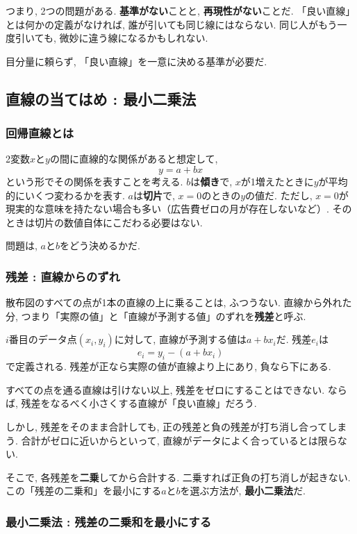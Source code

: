 つまり, 2つの問題がある.
\textbf{基準がない}ことと, \textbf{再現性がない}ことだ.
「良い直線」とは何かの定義がなければ, 誰が引いても同じ線にはならない.
同じ人がもう一度引いても, 微妙に違う線になるかもしれない.

目分量に頼らず, 「良い直線」を一意に決める基準が必要だ.


\subsection{直線の当てはめ : 最小二乗法}

\subsubsection*{回帰直線とは}

2変数$x$と$y$の間に直線的な関係があると想定して,
\[
  y = a + bx
\]
という形でその関係を表すことを考える.
$b$は\textbf{傾き}で, $x$が1増えたときに$y$が平均的にいくつ変わるかを表す.
$a$は\textbf{切片}で, $x = 0$のときの$y$の値だ.
ただし, $x = 0$が現実的な意味を持たない場合も多い（広告費ゼロの月が存在しないなど）.
そのときは切片の数値自体にこだわる必要はない.

問題は, $a$と$b$をどう決めるかだ.

\subsubsection*{残差 : 直線からのずれ}

散布図のすべての点が1本の直線の上に乗ることは, ふつうない.
直線から外れた分, つまり「実際の値」と「直線が予測する値」のずれを\textbf{残差}と呼ぶ.

$i$番目のデータ点$(x_i, y_i)$に対して, 直線が予測する値は$a + bx_i$だ.
残差$e_i$は
\[
  e_i = y_i - (a + bx_i)
\]
で定義される.
残差が正なら実際の値が直線より上にあり, 負なら下にある.

すべての点を通る直線は引けない以上, 残差をゼロにすることはできない.
ならば, 残差をなるべく小さくする直線が「良い直線」だろう.

しかし, 残差をそのまま合計しても, 正の残差と負の残差が打ち消し合ってしまう.
合計がゼロに近いからといって, 直線がデータによく合っているとは限らない.

そこで, 各残差を\textbf{二乗}してから合計する.
二乗すれば正負の打ち消しが起きない.
この「残差の二乗和」を最小にする$a$と$b$を選ぶ方法が, \textbf{最小二乗法}だ.

\subsubsection*{最小二乗法 : 残差の二乗和を最小にする}

